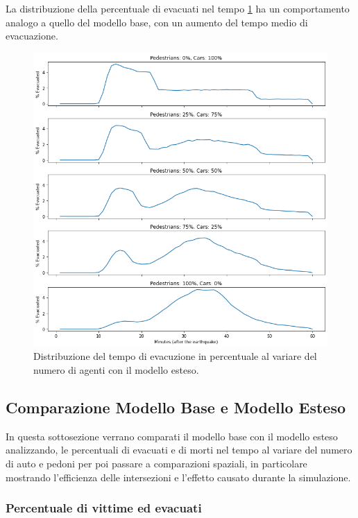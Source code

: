 \pagebreak

La distribuzione della percentuale di evacuati nel tempo \ref*{fig:analisi-new-evtimes} ha un comportamento analogo a quello del modello base, con un aumento del tempo medio di evacuazione.

\begin{figure}[ht]
    \centering
    \includegraphics[width=\textwidth]{images/analisi/new-evtimes.png}
    \caption{Distribuzione del tempo di evacuzione in percentuale al variare del numero di agenti con il modello esteso.}
    \label{fig:analisi-new-evtimes}
\end{figure}

\newpage

\subsection{Comparazione Modello Base e Modello Esteso}
In questa sottosezione verrano comparati il modello base con il modello esteso analizzando,
le percentuali di evacuati e di morti nel tempo al variare del numero di auto e pedoni per poi passare a comparazioni spaziali,
in particolare mostrando l'efficienza delle intersezioni e l'effetto causato durante la simulazione.

\subsubsection*{Percentuale di vittime ed evacuati}

